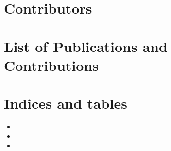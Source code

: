 \documentclass[letterpaper,10pt,english]{sphinxmanual}
\begin{document}
\chapter{Contributors}
\label{\detokenize{contributors:contributors}}\label{\detokenize{contributors::doc}}

\chapter{List of Publications and Contributions}
\label{\detokenize{publications:list-of-publications-and-contributions}}\label{\detokenize{publications::doc}}

\chapter{Indices and tables}
\label{\detokenize{index:indices-and-tables}}\begin{itemize}
\item {} 

\item {} 

\item {} 

\end{itemize}



\renewcommand{\indexname}{Index}
\printindex
\end{document}
